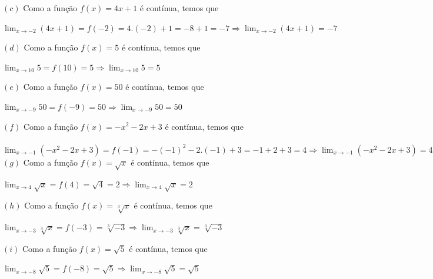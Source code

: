 \documentclass[12pt,openright,twoside,a4paper]{article}
\theoremstyle{definition}
\begin{document}
		$(c)$ Como a função $f(x) =  4x + 1$ é contínua, temos que \begin{center}$\displaystyle{\lim_{x \to -2} (4x + 1)} = f(-2) = 4.(-2) + 1 = -8 + 1 = -7 \Longrightarrow \displaystyle{\lim_{x \to -2} (4x + 1)} = -7$\end{center}
		
		$(d)$ Como a função $f(x) = 5$ é contínua, temos que \begin{center}$\displaystyle{\lim_{x \to 10} 5} = f(10) = 5 \Longrightarrow \displaystyle{\lim_{x \to 10} 5} = 5$\end{center}
		
		$(e)$ Como a função $f(x) = 50$ é contínua, temos que \begin{center}$\displaystyle{\lim_{x \to -9} 50} = f(-9) = 50 \Longrightarrow \displaystyle{\lim_{x \to -9} 50} = 50$\end{center}
		
		$(f)$ Como a função $f(x) = -x^{2} -2x + 3$ é contínua, temos que \\ \\ $\displaystyle{\lim_{x \to -1} (-x^{2} -2x + 3)} = f(-1) = -(-1)^{2} -2.(-1) + 3 = -1 + 2 + 3 = 4 \Rightarrow \displaystyle{\lim_{x \to -1} (-x^{2} -2x + 3)} = 4$ \\
		
		$(g)$ Como a função $f(x) = \sqrt{x}$ é contínua, temos que \begin{center}$\displaystyle{\lim_{x \to 4}\sqrt{x}} = f(4) = \sqrt{4} = 2 \Longrightarrow \displaystyle{\lim_{x \to 4} \sqrt{x}} = 2$\end{center}
		
		$(h)$ Como a função $f(x) = \sqrt[3]{x}$ é contínua, temos que \begin{center}$\displaystyle{\lim_{x \to -3}\sqrt[3]{x}} = f(-3) = \sqrt[3]{-3} \Longrightarrow \displaystyle{\lim_{x \to -3} \sqrt[3]{x}} = \sqrt[3]{-3}$\end{center}
		
		$(i)$ Como a função $f(x) = \sqrt{5}$ é contínua, temos que \begin{center}$\displaystyle{\lim_{x \to -8}\sqrt{5}} = f(-8) = \sqrt{5} \Longrightarrow \displaystyle{\lim_{x \to -8} \sqrt{5}}=\sqrt{5}$\end{center}
		
\end{document}

